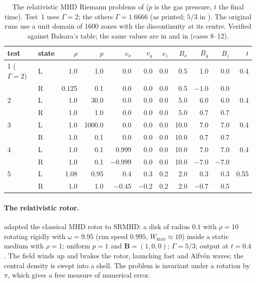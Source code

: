 \documentclass[11pt,a4paper,oneside,openany]{book}
\newcommand{\textcite}{\citet}
\theoremstyle{definition}
\theoremstyle{plain}
\theoremstyle{remark}
\newcommand{\BB}{\bm{B}}
\newcommand{\file}[1]{\texttt{\detokenize{#1}}}
\begin{document}
\begin{table}[t]
\centering\small
\setlength{\tabcolsep}{4.5pt}
\begin{tabular}{@{}ll rrrrrrrr r@{}}
\toprule
test & state & $\rho$ & $p$ & $v_x$ & $v_y$ & $v_z$ & $B_x$ & $B_y$ & $B_z$ & $t$\\
\midrule
1 ($\Gamma=2$) & L & 1.0 & 1.0 & 0.0 & 0.0 & 0.0 & 0.5 & 1.0 & 0.0 & 0.4\\
              & R & 0.125 & 0.1 & 0.0 & 0.0 & 0.0 & 0.5 & $-1.0$ & 0.0 & \\
2 & L & 1.0 & 30.0 & 0.0 & 0.0 & 0.0 & 5.0 & 6.0 & 6.0 & 0.4\\
  & R & 1.0 & 1.0 & 0.0 & 0.0 & 0.0 & 5.0 & 0.7 & 0.7 & \\
3 & L & 1.0 & 1000.0 & 0.0 & 0.0 & 0.0 & 10.0 & 7.0 & 7.0 & 0.4\\
  & R & 1.0 & 0.1 & 0.0 & 0.0 & 0.0 & 10.0 & 0.7 & 0.7 & \\
4 & L & 1.0 & 0.1 & 0.999 & 0.0 & 0.0 & 10.0 & 7.0 & 7.0 & 0.4\\
  & R & 1.0 & 0.1 & $-0.999$ & 0.0 & 0.0 & 10.0 & $-7.0$ & $-7.0$ & \\
5 & L & 1.08 & 0.95 & 0.4 & 0.3 & 0.2 & 2.0 & 0.3 & 0.3 & 0.55\\
  & R & 1.0 & 1.0 & $-0.45$ & $-0.2$ & 0.2 & 2.0 & $-0.7$ & 0.5 & \\
\bottomrule
\end{tabular}
\caption{The relativistic MHD Riemann problems of \textcite[Table~1]{Balsara2001} ($p$ is the
gas pressure, $t$ the final time). Test~1 uses $\Gamma=2$; the others $\Gamma=1.6666$ (as
printed; $5/3$ in \textcite{GiacomazzoRezzolla2006}). The original runs use a unit domain of
1600 zones with the discontinuity at its centre. Verified against Balsara's table; the same
values are in \textcite[Table~4]{GiacomazzoRezzolla2006} and in
\file{rmhd/initial_data.py} (cases 8--12).}
\label{tab:balsara}
\end{table}

\paragraph{The relativistic rotor.} \textcite{DelZanna2003} adapted the classical MHD rotor to
SRMHD: a disk of radius $0.1$ with $\rho=10$ rotating rigidly with $\omega=9.95$ (rim speed
$0.995$, $W_{\max}\approx10$) inside a static medium with $\rho=1$; uniform $p=1$ and
$\BB=(1,0,0)$; $\Gamma=5/3$; output at $t=0.4$. The field winds up and brakes the rotor,
launching fast and Alfvén waves; the central density is swept into a shell. The problem is
invariant under a rotation by $\pi$, which gives a free measure of numerical error.
\end{document}
